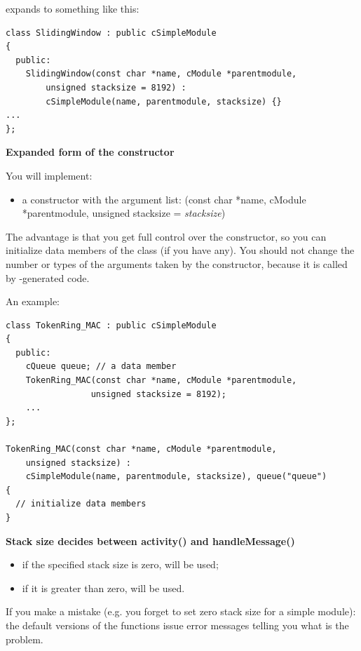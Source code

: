expands to something like this:

\begin{verbatim}
class SlidingWindow : public cSimpleModule
{
  public:
    SlidingWindow(const char *name, cModule *parentmodule,
        unsigned stacksize = 8192) :
        cSimpleModule(name, parentmodule, stacksize) {}
...
};
\end{verbatim}

\textbf{Expanded form of the constructor}


You will implement:
\begin{itemize}
\item{a constructor with the argument list: (const
    char *name, cModule *parentmodule, unsigned stacksize =
    \textit{stacksize})}
\end{itemize}

The advantage is that you get full control over the constructor,
so you can initialize data members of the class (if you have
any). You should not change the number or types of the arguments
taken by the constructor, because it is called by {\opp}-generated
code.


An example:

\begin{verbatim}
class TokenRing_MAC : public cSimpleModule
{
  public:
    cQueue queue; // a data member
    TokenRing_MAC(const char *name, cModule *parentmodule,
                 unsigned stacksize = 8192);
    ...
};

TokenRing_MAC(const char *name, cModule *parentmodule,
    unsigned stacksize) :
    cSimpleModule(name, parentmodule, stacksize), queue("queue")
{
  // initialize data members
}
\end{verbatim}


\textbf{Stack size decides between activity() and handleMessage()}

\begin{itemize}
\item{if the specified stack size is zero,  will be used;}
\item{if it is greater than zero,  will be used.}
\end{itemize}

If you make a mistake (e.g. you forget to set zero stack size
 for a 
simple module): the default versions of the
functions issue error messages telling you what is the problem.






